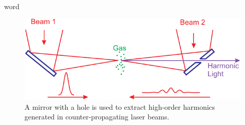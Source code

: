 \documentclass[oneside, astronomy, noacknowlegments]{BYUPhys}
\begin{document}
word
\cite{RefWorks:doc:58929816e4b0499fa95c51a6}
\cite{RefWorks:doc:58929629e4b0d4c09201f6b8}
\cite{RefWorks:doc:589299f4e4b0d4c09201f915}
\cite{RefWorks:doc:58929128e4b0228a292928a7}
\cite{RefWorks:doc:589299fbe4b0dec22aee3bd8}
\cite{RefWorks:doc:5892912ae4b0dec22aee3993}
\cite{RefWorks:doc:58929128e4b0499fa95c5064}
\cite{RefWorks:doc:5892989ee4b0499fa95c51c8}
\cite{RefWorks:doc:589293f5e4b0dec22aee39de}
\cite{RefWorks:doc:589295fce4b0d4c09201f6b4}
\cite{RefWorks:doc:58929a02e4b0d4c09201f91b}
\cite{RefWorks:doc:589295bde4b0d4c09201f692}
\cite{RefWorks:doc:58929264e4b0d4c09201f63b}
\cite{RefWorks:doc:58929129e4b0d4c09201f61e}
\cite{RefWorks:doc:58929602e4b0d4c09201f6b6}
\cite{RefWorks:doc:589296c6e4b0d4c09201f6f5}
\cite{RefWorks:doc:58929746e4b0dec22aee3a9a}
\cite{RefWorks:doc:589297a9e4b0d4c09201f736}
\cite{RefWorks:doc:58929800e4b0499fa95c51a1}
\cite{RefWorks:doc:589299f0e4b0dec22aee3bd6}
\cite{RefWorks:doc:58929786e4b0228a292929b8}
\cite{RefWorks:doc:58929612e4b0499fa95c50fa}
\cite{RefWorks:doc:5892964ee4b0499fa95c5108}
\cite{RefWorks:doc:58929c15e4b0228a29292c58}
\cite{RefWorks:doc:5892912ae4b0228a292928aa}

\begin{figure}
    \centerline{\includegraphics{Graphic1}}
    \caption[Setup for using counter-propagating light]{\label{fig:MirrorDiagram}
     A mirror with a hole is used to extract high-order harmonics generated in
     counter-propagating laser beams.}
\end{figure}







 

 \printindex
\end{document}
